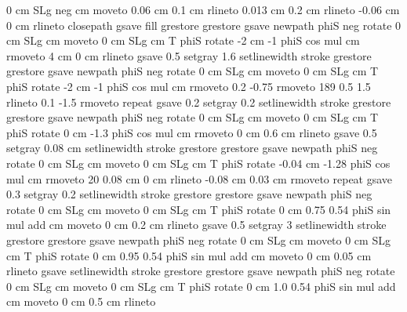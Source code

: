 {{         0 cm SLg  neg cm moveto
         0.06 cm 0.1 cm rlineto
         0.013 cm 0.2 cm rlineto
        -0.06 cm 0 cm rlineto
       closepath
     gsave
       \pst@usecolor\PoCMineCol
         fill
    grestore
   grestore
   gsave
     newpath
        phiS neg rotate
        0 cm SLg cm moveto
        0 cm SLg cm T
        phiS rotate
        -2 cm -1 phiS cos mul cm rmoveto
        4 cm 0 cm rlineto
    gsave
         0.5 setgray
                1.6 setlinewidth
         stroke
    grestore
   grestore
   gsave
     newpath
        phiS neg rotate
        0 cm SLg cm moveto
        0 cm SLg cm T
        phiS rotate
        -2 cm -1 phiS cos mul cm rmoveto
        0.2 -0.75 rmoveto
       189 { 0.5 1.5 rlineto
        0.1 -1.5 rmoveto } repeat
    gsave
         0.2 setgray
                0.2 setlinewidth
         stroke
    grestore
  grestore
  gsave
     newpath
        phiS neg rotate
        0 cm SLg cm moveto
        0 cm SLg cm T
        phiS rotate
        0 cm -1.3 phiS cos mul cm rmoveto
        0 cm 0.6 cm rlineto
    gsave
         0.5 setgray
                0.08 cm setlinewidth
         stroke
    grestore
   grestore
   gsave
     newpath
        phiS neg rotate
        0 cm SLg cm moveto
        0 cm SLg cm T
        phiS rotate
        -0.04 cm -1.28 phiS cos mul cm rmoveto
        20 { 0.08 cm 0 cm rlineto
        -0.08 cm 0.03 cm rmoveto } repeat
    gsave
         0.3 setgray
                0.2 setlinewidth
         stroke
    grestore
   grestore
  gsave
     newpath
        phiS neg rotate
        0 cm SLg cm moveto
        0 cm SLg cm T
        phiS rotate
        0 cm 0.75 0.54 phiS sin mul add cm moveto
        0 cm 0.2 cm rlineto
    gsave
         0.5 setgray
                3 setlinewidth
         stroke
    grestore
   grestore
   gsave
     newpath
        phiS neg rotate
        0 cm SLg cm moveto
        0 cm SLg cm T
        phiS rotate
        0 cm 0.95 0.54 phiS sin mul add cm moveto
        0 cm 0.05 cm rlineto
    gsave
         \pst@usecolor{} setlinewidth
         stroke
    grestore
   grestore
   gsave
     newpath
        phiS neg rotate
        0 cm SLg cm moveto
        0 cm SLg cm T
        phiS rotate
        0 cm 1.0 0.54 phiS sin mul add cm moveto
        0 cm 0.5 cm rlineto
}}
